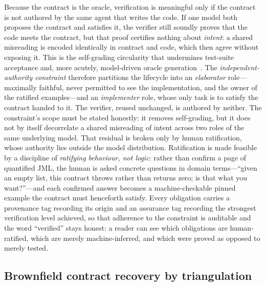 Because the contract is the oracle, verification is meaningful only if the contract
is not authored by the same agent that writes the code. If one model both proposes
the contract and satisfies it, the verifier still soundly proves that the code
meets the contract, but that proof certifies nothing about \emph{intent}: a shared
misreading is encoded identically in contract and code, which then agree without
exposing it. This is the self-grading circularity that undermines test-suite
acceptance and, more acutely, model-driven oracle
generation~\citep{liu2026oracle}. The \emph{independent-authority constraint}
therefore partitions the lifecycle into an \emph{elaborator} role---maximally
faithful, never permitted to see the implementation, and the owner of the
ratified examples---and an \emph{implementer} role, whose only task is to satisfy
the contract handed to it. The verifier, reused unchanged, is authored by neither.
The constraint's scope must be stated honestly: it removes self-grading, but it
does not by itself decorrelate a shared misreading of intent across two roles of
the same underlying model. That residual is broken only by human ratification,
whose authority lies outside the model distribution. Ratification is made feasible
by a discipline of \emph{ratifying behaviour, not logic}: rather than confirm a
page of quantified JML, the human is asked concrete questions in domain
terms---``given an empty list, this contract throws rather than returns zero; is
that what you want?''---and each confirmed answer becomes a machine-checkable
pinned example the contract must henceforth satisfy. Every obligation carries a
provenance tag recording its origin and an assurance tag recording the strongest
verification level achieved, so that adherence to the constraint is auditable and
the word ``verified'' stays honest: a reader can see which obligations are
human-ratified, which are merely machine-inferred, and which were proved as opposed
to merely tested.

\subsection{Brownfield contract recovery by triangulation}\label{sec:int-brownfield}

